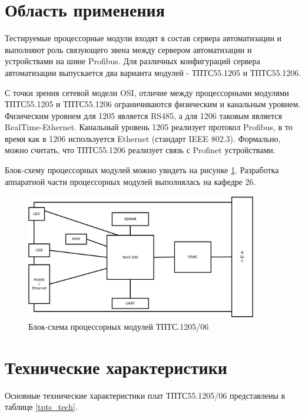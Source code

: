 \documentclass[a4paper,14pt,bachelor]{disser}
\begin{document}
\section{Область применения}
Тестируемые процессорные модули входят в состав сервера автоматизации и выполняют роль связующего звена между сервером автоматизации и устройствами на шине Profibus. Для различных конфигураций сервера автоматизации выпускается два варианта модулей - ТПТС55.1205 и ТПТС55.1206.

С точки зрения сетевой модели OSI, отличие между процессорными модулями ТПТС55.1205 и ТПТС55.1206 ограничиваются физическим и канальным уровнем. Физическим уровнем для 1205 является RS485, а для 1206 таковым является RealTime-Ethernet. Канальный уровень 1205 реализует протокол Profibus, в то время как в 1206 используется Ethernet (стандарт IEEE 802.3). Формально, можно считать, что ТПТС55.1206 реализует связь с Profinet устройствами.

Блок-схему процессорных модулей можно увидеть на рисунке \ref{tpts_scheme}. Разработка аппаратной части процессорных модулей выполнялась на кафедре 26.

\begin{figure}[h!] %
\addtocounter{myfigs}{1}
 \begin{center}
 \includegraphics[width=0.9\textwidth]{tpts_scheme}
 \caption{\label{tpts_scheme} Блок-схема процессорных модулей ТПТС.1205/06}
 \end{center}
\end{figure}

\section{Технические характеристики}
Основные технические характеристики плат ТПТС55.1205/06 представлены в таблице \ref{tpts_tech}.
\end{document}
